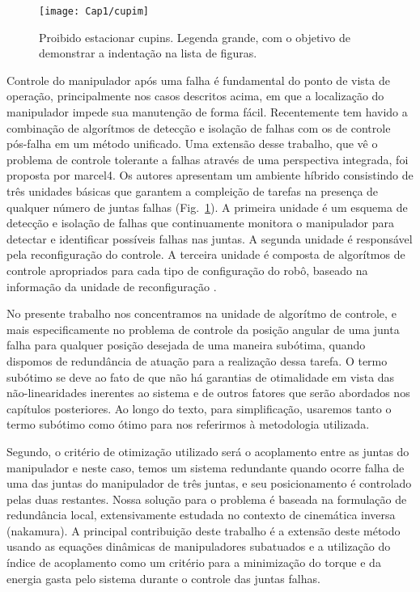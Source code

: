 \begin{figure}[ht]
\centering
\texttt{[image: Cap1/cupim]}
\caption{Proibido estacionar cupins. Legenda grande, com o objetivo de demonstrar a indentação na lista de figuras.}
\label{cupim}
\end{figure}

Controle do manipulador após uma falha é fundamental do ponto de vista de operação, principalmente nos casos descritos acima, em que a localização do manipulador impede sua manutenção de forma fácil. Recentemente tem havido a combinação
de algorítmos de detecção e isolação de falhas com os de controle pós-falha em um método unificado. Uma extensão desse trabalho, que vê o problema de controle tolerante a falhas através de uma perspectiva integrada, foi proposta por
{marcel4}. Os autores apresentam um ambiente híbrido consistindo de três unidades básicas que garantem a compleição de tarefas na presença de qualquer número de juntas falhas (Fig.~\ref{cupim}). A primeira unidade é um esquema de detecção
e isolação de falhas que continuamente monitora o manipulador para detectar e identificar possíveis falhas nas juntas. A segunda unidade é responsável pela reconfiguração do controle. A terceira unidade é composta de algorítmos de
controle apropriados para cada tipo de configuração do robô, baseado na informação da unidade de reconfiguração \cite{COFFEE2000}.

No presente trabalho nos concentramos na unidade de algorítmo de controle, e mais especificamente no problema de controle da posição  angular de uma junta falha para qualquer posição desejada de uma maneira subótima, quando dispomos
de redundância de atuação para a realização dessa tarefa. O termo subótimo se deve ao fato de que não há garantias de otimalidade em vista das não-linearidades inerentes ao sistema e de outros fatores que serão abordados nos capítulos posteriores. Ao longo do texto, para simplificação, usaremos tanto o termo subótimo como ótimo para nos referirmos à metodologia utilizada.

Segundo, o critério de otimização utilizado será o acoplamento entre as juntas do
manipulador e neste caso, temos um sistema redundante quando ocorre falha de uma das juntas do manipulador de três juntas, e seu posicionamento é controlado pelas duas restantes. Nossa solução para o problema é baseada na formulação
de redundância local, extensivamente estudada no contexto de cinemática inversa ({nakamura}). A principal contribuição deste trabalho é a extensão deste método usando as equações dinâmicas de manipuladores subatuados e a utilização do índice de acoplamento como um critério para a minimização do torque e da energia gasta pelo sistema durante o controle das juntas falhas.

